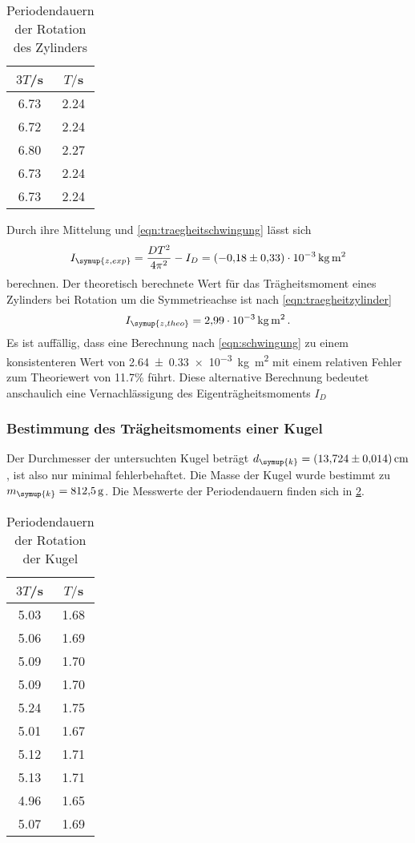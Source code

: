 \begin{table}
\centering
\caption{Periodendauern der Rotation des Zylinders}
\label{tab:zylinder}
\begin{tabular}{c c}
\toprule
$3T$/s & $T/$s \\
\midrule
6.73 & 2.24 \\
6.72 & 2.24 \\
6.80 & 2.27 \\
6.73 & 2.24 \\
6.73 & 2.24 \\
\bottomrule
\end{tabular}
\end{table}

Durch ihre Mittelung und \eqref{eqn:traegheitschwingung} lässt sich
\begin{equation}
  I_{\symup{z,exp}} = \frac{DT^2}{4\pi^2}-I_D = \SI{-0.18(033)e-3}{\kilogram\meter\squared}
\end{equation}
berechnen. Der theoretisch berechnete Wert für das Trägheitsmoment eines Zylinders
bei Rotation um die Symmetrieachse ist nach \eqref{eqn:traegheitzylinder}
\begin{equation}
  I_{\symup{z,theo}} = \SI{2.99e-3}{\kilogram\meter\squared}\,.
\end{equation}
Es ist auffällig, dass eine Berechnung nach \eqref{eqn:schwingung} zu einem
konsistenteren Wert von \SI{2.64(033)e-3}{\kilogram\meter\squared} mit einem
relativen Fehler zum Theoriewert von 11.7\% führt. Diese alternative Berechnung
bedeutet anschaulich eine Vernachlässigung des Eigenträgheitsmoments $I_D$

\subsubsection{Bestimmung des Trägheitsmoments einer Kugel}
Der Durchmesser der untersuchten Kugel beträgt $d_{\symup{k}}=\SI{13.724(0014)}{\cm}$,
ist also nur minimal fehlerbehaftet. Die Masse der Kugel wurde bestimmt zu
$m_{\symup{k}}=\SI{812.5}{\gram}$. Die Messwerte der Periodendauern finden sich
in \ref{tab:kugel}.

\begin{table}
\centering
\caption{Periodendauern der Rotation der Kugel}
\label{tab:kugel}
\begin{tabular}{c c}
\toprule
$3T$/s & $T/$s \\
\midrule
5.03 & 1.68 \\
5.06 & 1.69 \\
5.09 & 1.70 \\
5.09 & 1.70 \\
5.24 & 1.75 \\
5.01 & 1.67 \\
5.12 & 1.71 \\
5.13 & 1.71 \\
4.96 & 1.65 \\
5.07 & 1.69 \\
\bottomrule
\end{tabular}
\end{table}


